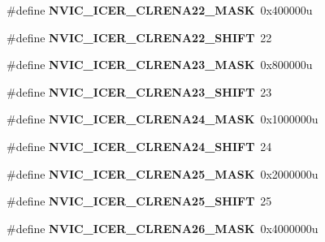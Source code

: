\begin{DoxyCompactItemize}
\#define {\bfseries N\+V\+I\+C\+\_\+\+I\+C\+E\+R\+\_\+\+C\+L\+R\+E\+N\+A22\+\_\+\+M\+A\+SK}~0x400000u
\item 
\mbox{\label{group___n_v_i_c___register___masks_ga76e6fc6d65c0ad29a5c9a55e94af68bb}} 
\#define {\bfseries N\+V\+I\+C\+\_\+\+I\+C\+E\+R\+\_\+\+C\+L\+R\+E\+N\+A22\+\_\+\+S\+H\+I\+FT}~22
\item 
\mbox{\label{group___n_v_i_c___register___masks_ga60342c001b88e3e3cffa9c0698561397}} 
\#define {\bfseries N\+V\+I\+C\+\_\+\+I\+C\+E\+R\+\_\+\+C\+L\+R\+E\+N\+A23\+\_\+\+M\+A\+SK}~0x800000u
\item 
\mbox{\label{group___n_v_i_c___register___masks_ga0e37b1fbb84da874a2895cf218ed35fa}} 
\#define {\bfseries N\+V\+I\+C\+\_\+\+I\+C\+E\+R\+\_\+\+C\+L\+R\+E\+N\+A23\+\_\+\+S\+H\+I\+FT}~23
\item 
\mbox{\label{group___n_v_i_c___register___masks_ga93a21554ca104636395542f6fc6efd6d}} 
\#define {\bfseries N\+V\+I\+C\+\_\+\+I\+C\+E\+R\+\_\+\+C\+L\+R\+E\+N\+A24\+\_\+\+M\+A\+SK}~0x1000000u
\item 
\mbox{\label{group___n_v_i_c___register___masks_gad80450cb890f4b0e6d28710d1b148d52}} 
\#define {\bfseries N\+V\+I\+C\+\_\+\+I\+C\+E\+R\+\_\+\+C\+L\+R\+E\+N\+A24\+\_\+\+S\+H\+I\+FT}~24
\item 
\mbox{\label{group___n_v_i_c___register___masks_ga073578acff1977037e578c80246d65fc}} 
\#define {\bfseries N\+V\+I\+C\+\_\+\+I\+C\+E\+R\+\_\+\+C\+L\+R\+E\+N\+A25\+\_\+\+M\+A\+SK}~0x2000000u
\item 
\mbox{\label{group___n_v_i_c___register___masks_gae7ee3429daac3acad2fb4243991a2a57}} 
\#define {\bfseries N\+V\+I\+C\+\_\+\+I\+C\+E\+R\+\_\+\+C\+L\+R\+E\+N\+A25\+\_\+\+S\+H\+I\+FT}~25
\item 
\mbox{\label{group___n_v_i_c___register___masks_gafdbc83b793a8dd6fc36eb373420aebd0}} 
\#define {\bfseries N\+V\+I\+C\+\_\+\+I\+C\+E\+R\+\_\+\+C\+L\+R\+E\+N\+A26\+\_\+\+M\+A\+SK}~0x4000000u

\end{DoxyCompactItemize}
